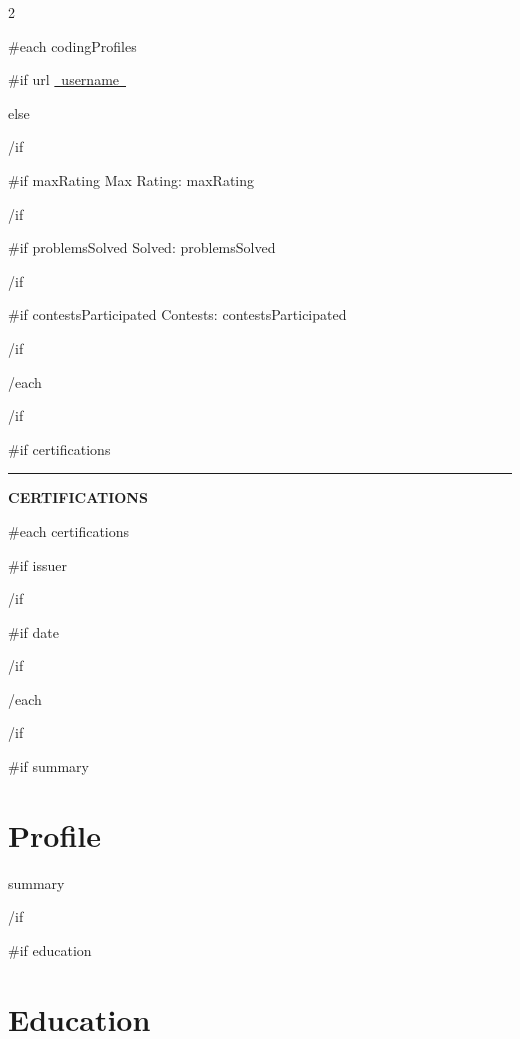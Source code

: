 \documentclass[10pt,a4paper]{article}
\newcommand{\sidebarseparator}{%
    \par\vspace{5pt}%
    {\color{sideMuted!45}\rule{\linewidth}{0.5pt}}%
    \par\vspace{5pt}%
}
\begin{document}
\begin{paracol}{2}
{\small
{{#each codingProfiles}}
\textbf{ }
\par

{{#if url}}
\href{ {{~url~}} }{ {{~username~}} }
\par
{{else}}
{ }
\par
{{/if}}

{{#if maxRating}}
{\color{sideMuted}Max Rating: {{maxRating}} }
\par
{{/if}}

{{#if problemsSolved}}
{\color{sideMuted}Solved: {{problemsSolved}} }
\par
{{/if}}

{{#if contestsParticipated}}
{\color{sideMuted}Contests: {{contestsParticipated}} }
\par
{{/if}}

\vspace{4pt}
{{/each}}
}
{{/if}}

{{#if certifications}}
\sidebarseparator
{\large\bfseries\color{accent}CERTIFICATIONS\par}
\vspace{3pt}

{\small
{{#each certifications}}
\textbf{ }
\par

{{#if issuer}}
{ }
\par
{{/if}}

{{#if date}}
{ }
\par
{{/if}}

\vspace{4pt}
{{/each}}
}
{{/if}}

\switchcolumn
\color{bodytext}

{{#if summary}}
\section{Profile}
{{summary}}
\par
{{/if}}

{{#if education}}
\section{Education}


\end{paracol}
\end{document}
